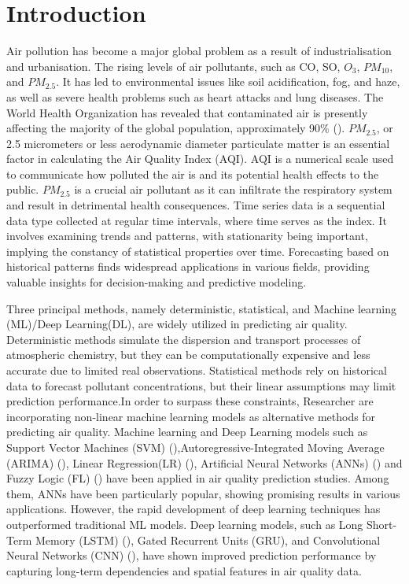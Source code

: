 \documentclass[a4paper,fleqn]{cas-dc}
\begin{document}
\section{Introduction}
Air pollution has become a major global problem as a result of industrialisation and urbanisation. The rising levels of air pollutants, such as CO, SO, $O_3$, $PM_{10}$, and $PM_{2.5}$. It has led to environmental issues like soil acidification, fog, and haze, as well as severe health problems such as heart attacks and lung diseases. The World Health Organization has revealed that contaminated air is presently affecting the majority of the global population, approximately 90\% (\cite{zhou2019effects}). $PM_{2.5}$, or 2.5 micrometers or less aerodynamic diameter particulate matter is an essential factor in calculating the Air Quality Index (AQI). AQI is a numerical scale used to communicate how polluted the air is and its potential health effects to the public. $PM_{2.5}$ is a crucial air pollutant as it can infiltrate the respiratory system and result in detrimental health consequences. Time series data is a sequential data type collected at regular time intervals, where time serves as the index. It involves examining trends and patterns, with stationarity being important, implying the constancy of statistical properties over time. Forecasting based on historical patterns finds widespread applications in various fields, providing valuable insights for decision-making and predictive modeling.

Three principal methods, namely deterministic, statistical, and Machine learning (ML)/Deep Learning(DL), are widely utilized in predicting air quality. Deterministic methods simulate the dispersion and transport processes of atmospheric chemistry, but they can be computationally expensive and less accurate due to limited real observations. Statistical methods rely on historical data to forecast pollutant concentrations, but their linear assumptions may limit prediction performance.In order to surpass these constraints, Researcher are incorporating non-linear machine learning models as alternative methods for predicting air quality. Machine learning and Deep Learning models such as Support Vector Machines (SVM) (\cite{lin2011forecasting}),Autoregressive-Integrated Moving Average (ARIMA) (\cite{kumari2022machine}), Linear Regression(LR) (\cite{kumari2022deep}), Artificial Neural Networks (ANNs) (\cite{taylan2017modelling}) and Fuzzy Logic (FL) (\cite{wang2015model}) have been applied in air quality prediction studies. Among them, ANNs have been particularly popular, showing promising results in various applications. However, the rapid development of deep learning techniques has outperformed traditional ML models. Deep learning models, such as Long Short-Term Memory (LSTM) (\cite{kristiani2022short}), Gated Recurrent Units (GRU), and Convolutional Neural Networks (CNN) (\cite{ayturan2018air}), have shown improved prediction performance by capturing long-term dependencies and spatial features in air quality data.
\end{document}
